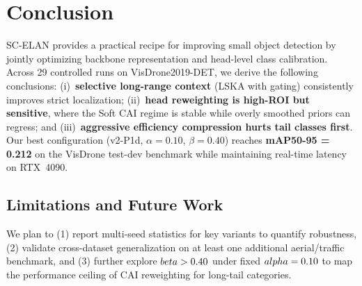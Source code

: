 \section{Conclusion}

SC-ELAN provides a practical recipe for improving small object detection by jointly optimizing backbone representation and head-level class calibration.
Across 29 controlled runs on VisDrone2019-DET, we derive the following conclusions:
(i)~\textbf{selective long-range context} (LSKA with gating) consistently improves strict localization;
(ii)~\textbf{head reweighting is high-ROI but sensitive}, where the Soft CAI regime is stable while overly smoothed priors can regress;
and (iii)~\textbf{aggressive efficiency compression hurts tail classes first}.
Our best configuration (v2-P1d, $\alpha{=}0.10$, $\beta{=}0.40$) reaches \textbf{mAP50-95 = 0.212} on the VisDrone test-dev benchmark while maintaining real-time latency on RTX~4090.

\subsection{Limitations and Future Work}
We plan to (1) report multi-seed statistics for key variants to quantify robustness, (2) validate cross-dataset generalization on at least one additional aerial/traffic benchmark, and (3) further explore $\\beta>0.40$ under fixed $\\alpha=0.10$ to map the performance ceiling of CAI reweighting for long-tail categories.
